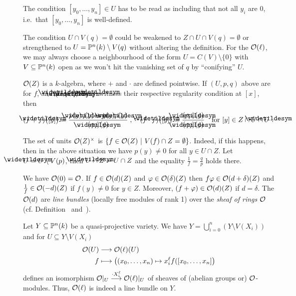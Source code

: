\documentclass[a4paper,parskip=half,numbers=enddot, DIV=12, headheight=30pt]{scrreprt}
\begin{document}
\begin{rem}
    \begin{alphanumerate}
        \item {}
            The condition $[y_0,\ldots, y_n]\in U$ has to be read as including that not all $y_i$ are $0$, i.e.\ that $[y_0,\ldots, y_n]$ is well-defined.
        \item 
            The condition $U\cap V(q) = \emptyset$ could be weakened to $Z\cap U\cap V(q) = \emptyset$ or strengthened to $U=\mathbb{P}^n(k)\setminus V(q)$ without altering the definition. For the $\mathcal{O}(\ell)$, we may always choose a neighbourhood of the form $U=C(V)\setminus\{0\}$ with $V\subseteq \mathbb{P}^n(k)$ open as we won't hit the vanishing set of $q$ by ``conifying'' $U$.
        \item 
            $\mathcal{O}(Z)$ is a $k$-algebra, where $+$ and $\cdot$ are defined pointwise. If $(U,p,q)$ above are for $f$, and $(\snake U, \snake p, \snake q)$ for $\snake f$ witness their respective regularity condition at $[x]$, then
            \begin{align*}
                (f+\snake f)\big([y]\big) = \frac{p(y)\snake q(y) + q(y)\snake p(y)}{(q\snake q)(y)}\;,\quad
                (f\cdot\snake f)\big([y]\big) = \frac{(p\snake p)(y)}{(q\snake q)(y)}\quad\text{for }[y]\in Z\cap U\cap\snake U\;.
            \end{align*}
        \item 
            The set of units $\mathcal{O}(Z)^\times$ is $\left\{f\in \mathcal{O}(Z)\ \middle|\  V(f)\cap Z = \emptyset\right\}$. Indeed, if this happens, then in the above situation we have $p(y)\neq0$ for all $y\in U\cap Z$. Let $\snake U = U\setminus V(p)$, then $\snake U \cap Z = U\cap Z$ and the equality $\frac{1}{f} = \frac{q}{p}$ holds there.
        \item We have $\mathcal{O}(0)=\mathcal{O}$. If $f\in \mathcal{O}(d)(Z)$ and $\varphi\in\mathcal{O}(\delta)(Z)$ then $f\varphi \in \mathcal{O}(d+\delta)(Z)$ and $\frac{1}{f}\in \mathcal{O}(-d)(Z)$ if $f(y) \neq 0$ for $y\in Z$. Moreover, $(f+\varphi)\in \mathcal{O}(d)(Z)$ if $d=\delta$. The $\mathcal{O}(d)$ are \emph{line bundles} (locally free modules of rank 1) over the \emph{sheaf of rings} $\mathcal{O}$ (cf. Definition~ and~).
    \end{alphanumerate}
\end{rem}
\begin{example}
    Let $Y\subseteq \mathbb{P}^n(k)$ be a quasi-projective variety. We have $Y = \bigcup_{i=0}^n (Y\setminus V(X_i))$ and for $U\subseteq Y\setminus V(X_i)$
    \begin{align*}
        \Oo(U) &\morphism \Oo(\ell)(U)\\
        f&\longmapsto \big((x_0,\ldots, x_n) \mapsto x_i^\ell f([x_0,\ldots, x_n]\big)
    \end{align*}
    defines an isomorphism $\Oo|_U \morphism[\cdot X_i^\ell] \Oo(\ell)|_U$ of sheaves of (abelian groups or) $\mathcal{O}$-modules. Thus, $\mathcal{O}(\ell)$ is indeed a line bundle on $Y$. 
\end{example}
\end{document}
